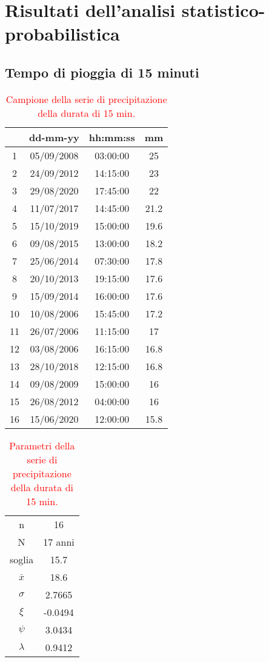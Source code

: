 \section{Risultati dell'analisi statistico-probabilistica}
\subsection{Tempo di pioggia di 15 minuti}

\begin{table}[H] \centering
    \caption{\textcolor{red}{Campione della serie di precipitazione della durata di 15 min.}}
    \begin{tabular}{cccc}
        \toprule    
       & dd-mm-yy   & hh:mm:ss & mm \\
       \midrule
    1  & 05/09/2008 & 03:00:00 & 25   \\
    2  & 24/09/2012 & 14:15:00 & 23   \\
    3  & 29/08/2020 & 17:45:00 & 22   \\
    4  & 11/07/2017 & 14:45:00 & 21.2 \\
    5  & 15/10/2019 & 15:00:00 & 19.6 \\
    6  & 09/08/2015 & 13:00:00 & 18.2 \\
    7  & 25/06/2014 & 07:30:00 & 17.8 \\
    8  & 20/10/2013 & 19:15:00 & 17.6 \\
    9  & 15/09/2014 & 16:00:00 & 17.6 \\
    10 & 10/08/2006 & 15:45:00 & 17.2 \\
    11 & 26/07/2006 & 11:15:00 & 17   \\
    12 & 03/08/2006 & 16:15:00 & 16.8 \\
    13 & 28/10/2018 & 12:15:00 & 16.8 \\
    14 & 09/08/2009 & 15:00:00 & 16   \\
    15 & 26/08/2012 & 04:00:00 & 16   \\
    16 & 15/06/2020 & 12:00:00 & 15.8 \\
    \bottomrule
    \end{tabular}
    \end{table}

    \begin{table}[H] \centering
        \caption{\textcolor{red}{Parametri della serie di precipitazione della durata di 15 min.}}
        \begin{tabular}{cc}
            \toprule
        n        &    16     \\
        N        & 17 anni \\
        soglia   &     15.7    \\
        $\bar{x}$    &     18.6    \\
        $\sigma$ &     2.7665    \\
        $\xi$      &    -0.0494     \\
        $\psi$      &      3.0434   \\
        $\lambda$   &        0.9412  \\
    \bottomrule    
    \end{tabular}
        \end{table}
    
